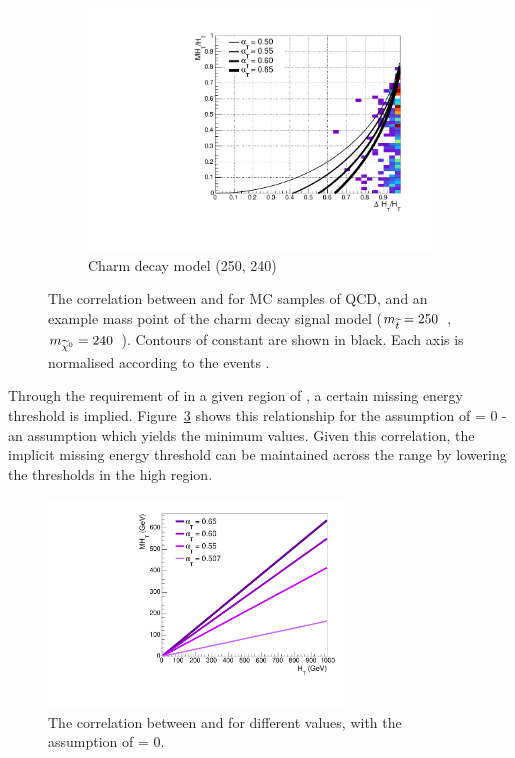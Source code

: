 \begin{figure}[t!]
\begin{subfigure}[t]{.46\textwidth}
    \includegraphics[width=\textwidth]{Figs/alphat/alphat_correlation_T2cc_250_240.pdf}
    \caption{Charm decay model (250, 240)}
    \label{fig:alphat_corr_t2cc}
  \end{subfigure}
  \caption{The correlation between \mht and \deltaHT for MC samples of QCD,
  \zinv and an example mass point of the charm decay signal model ($m_{\widetilde{t}} =
  250$~\gev, $m_{\widetilde{\chi}^{0}} = 240$~\gev). Contours of constant \alphat are shown in
  black. Each axis is normalised according to the events \HT.}
  \label{fig:alphat_corr}
\end{figure}

Through the requirement of \alphat in a given region of \HT, a certain missing
energy threshold is implied. Figure~\ref{fig:alphat_mht_corr} shows this
relationship for
the assumption of \deltaHT = 0 - an assumption which yields the minimum \mht
values. Given this correlation, the implicit missing energy threshold can be
maintained across the \HT range by lowering the \alphat thresholds in the high
\HT
region.

\begin{figure}
  \centering
  \includegraphics[width=0.7\textwidth]{Figs/alphat/mht_correlation.pdf}
  \caption{The correlation between \HT and \mht for different \alphat values,
  with the assumption of \deltaHT = 0.}
  \label{fig:alphat_mht_corr}
\end{figure}

